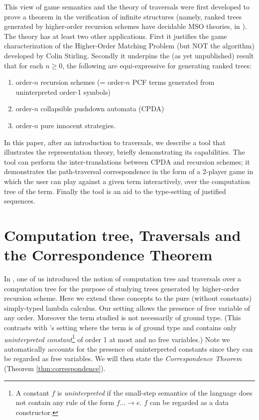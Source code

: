 This view of game semantics and the theory of traversals were first developed to prove a theorem in the verification of infinite structures (namely, ranked trees generated by higher-order recursion schemes have decidable MSO theories, in \cite{OngLics2006}). The theory has at least two other applications. First it justifies the game characterization of the Higher-Order Matching Problem (but NOT the algorithm) developed by Colin Stirling. Secondly it underpins the (as yet unpublished) result that for each $n \geq 0$, the following are equi-expressive for generating ranked trees:
\begin{enumerate}
\item order-$n$ recursion schemes (= order-$n$ PCF terms generated from uninterpreted order-1 symbols)

\item order-$n$ collapsible pushdown automata (CPDA)

\item order-$n$ pure innocent strategies.
\end{enumerate}

In this paper, after an introduction to traversals, we describe a tool that illustrates the representation theory, briefly demonstrating its capabilities. The tool can perform the inter-translations between CPDA and recursion schemes; it demonstrates the path-traversal correspondence in the form of a 2-player game in which the user can play against a given term interactively, over the computation tree of the term. Finally the tool is an aid to the type-setting of justified sequences.

\section{Computation tree, Traversals and the Correspondence Theorem}

In \cite{OngLics2006}, one of us introduced the notion of computation tree and traversals over a computation tree for the purpose of studying trees generated by higher-order recursion scheme. Here we extend these concepts to the pure (\ie without constants) simply-typed lambda calculus. Our setting allows the presence of free variable of any order. Moreover the term studied is not necessarily of ground type. (This contrasts with \cite{OngLics2006}'s setting where the term is of ground type and contains only \emph{uninterpreted constant}\footnote{A constant $f$ is  \emph{uninterpreted} if the small-step semantics of the language
  does not contain any rule of the form $f \dots \rightarrow e$. $f$
  can be regarded as a data constructor.} of order 1 at most and no
free variables.) Note we automatically accounts for the presence of uninterpreted constants since they can be regarded as free variables. We will then state the \emph{Correspondence Theorem} (Theorem \ref{thm:correspondence}).

